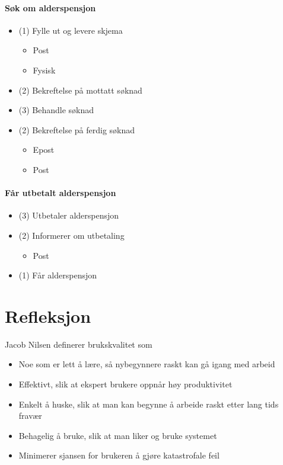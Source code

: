 \documentclass[informationsecurity]{gucmasterproject}
\begin{document}
\subsubsection{Søk om alderspensjon}
\begin{itemize}
\item (1) Fylle ut og levere skjema
	\begin{itemize}
	\item Post
	\item Fysisk
	\end{itemize}
\item (2) Bekreftelse på mottatt søknad
\item (3) Behandle søknad
\item (2) Bekreftelse på ferdig søknad
	\begin{itemize}
	\item Epost
	\item Post
	\end{itemize}
\end{itemize}

\subsubsection{Får utbetalt alderspensjon}
\begin{itemize}
\item (3) Utbetaler alderspensjon
\item (2) Informerer om utbetaling
	\begin{itemize}
	\item Post
	\end{itemize}
\item (1) Får alderspensjon
\end{itemize}




\chapter{Refleksjon}
Jacob Nilsen definerer brukskvalitet som
\begin{itemize}
\item Noe som er lett å lære, så nybegynnere raskt kan gå igang med arbeid
\item Effektivt, slik at ekspert brukere oppnår høy produktivitet
\item Enkelt å huske, slik at man kan begynne å arbeide raskt etter lang tids fravær
\item Behagelig å bruke, slik at man liker og bruke systemet
\item Minimerer sjansen for brukeren å gjøre katastrofale feil
\end{itemize}
\end{document}
